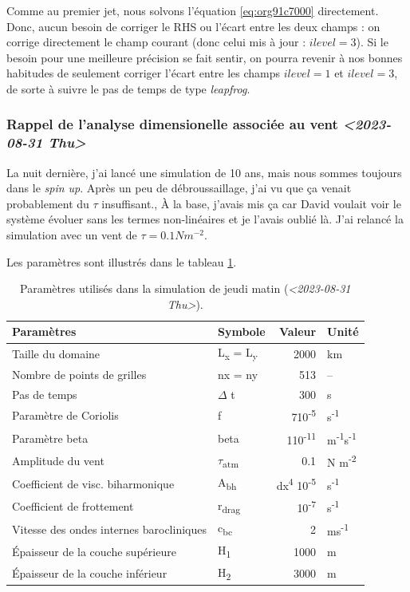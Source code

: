 \documentclass[10pt]{article}
\numberwithin{equation}{section}
\begin{document}
Comme au premier jet, nous solvons l'équation \ref{eq:org91c7000} directement.
Donc, aucun besoin de corriger le RHS ou l'écart entre les deux champs : on corrige directement le champ courant (donc celui mis à jour : \(ilevel=3\)).
Si le besoin pour une meilleure précision se fait sentir, on pourra revenir à nos bonnes habitudes de seulement corriger l'écart entre les champs \(ilevel=1\) et \(ilevel=3\), de sorte à suivre le pas de temps de type \emph{leapfrog}.

\subsubsection{Rappel de l'analyse dimensionelle associée au vent \textit{<2023-08-31 Thu>}}
\label{sec:org3ca242b}
La nuit dernière, j'ai lancé une simulation de 10 ans, mais nous sommes toujours dans le \emph{spin up}.
Après un peu de débroussaillage, j'ai vu que ça venait probablement du \(\tau\) insuffisant.,
À la base, j'avais mis ça car David voulait voir le système évoluer sans les termes non-linéaires et je l'avais oublié là.
J'ai relancé la simulation avec un vent de \(\tau = 0.1 Nm^{-2}\).\bigskip

Les paramètres sont illustrés dans le tableau \ref{tab:orgb399333}.

\begin{table}[htbp]
\caption{\label{tab:orgb399333}Paramètres utilisés dans la simulation de jeudi matin (\textit{<2023-08-31 Thu>}).}
\centering
\begin{tabular}{llrl}
\hline
\hline
Paramètres & Symbole & Valeur & Unité\\[0pt]
\hline
Taille du domaine & L\textsubscript{x} = L\textsubscript{y} & 2000 & km\\[0pt]
Nombre de points de grilles & nx = ny & 513 & --\\[0pt]
Pas de temps & \(\Delta\) t & 300 & s\\[0pt]
Paramètre de Coriolis & f & 7\texttimes{}10\textsuperscript{-5} & s\textsuperscript{-1}\\[0pt]
Paramètre beta & beta & 1\texttimes{}10\textsuperscript{-11} & m\textsuperscript{-1}s\textsuperscript{-1}\\[0pt]
Amplitude du vent & \(\tau\)\textsubscript{atm} & 0.1 & N m\textsuperscript{-2}\\[0pt]
Coefficient de visc. biharmonique & A\textsubscript{bh} & dx\textsuperscript{4} \texttimes{}10\textsuperscript{-5} & s\textsuperscript{-1}\\[0pt]
Coefficient de frottement & r\textsubscript{drag} & 10\textsuperscript{-7} & s\textsuperscript{-1}\\[0pt]
Vitesse des ondes internes barocliniques & c\textsubscript{bc} & 2 & ms\textsuperscript{-1}\\[0pt]
Épaisseur de la couche supérieure & H\textsubscript{1} & 1000 & m\\[0pt]
Épaisseur de la couche inférieur & H\textsubscript{2} & 3000 & m\\[0pt]
\hline
\end{tabular}
\end{table}
\end{document}
